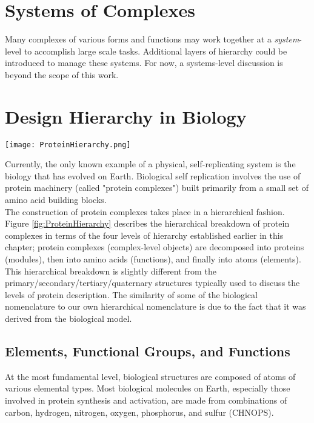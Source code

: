 {\section{Systems of Complexes}

Many complexes of various forms and functions may work together at a \textit{system}-level to accomplish large scale tasks.  Additional layers of hierarchy could be introduced to manage these systems.  For now, a systems-level discussion is beyond the scope of this work.

\section{Design Hierarchy in Biology}

\begin{sidewaysfigure}
  \texttt{[image: ProteinHierarchy.png]}
  \caption{Hierarchical breakdown of protein complexes (complexes) into proteins (modules), amino acids (functions), and atoms (elements).}
  \label{fig:ProteinHierarchy}
\end{sidewaysfigure}


Currently, the only known example of a physical, self-replicating system is the biology that has evolved on Earth.  Biological self replication involves the use of protein machinery (called "protein complexes") built primarily from a small set of amino acid building blocks.\\

The construction of protein complexes takes place in a hierarchical fashion.  Figure \ref{fig:ProteinHierarchy} describes the hierarchical breakdown of protein complexes in terms of the four levels of hierarchy established earlier in this chapter; protein complexes (complex-level objects) are decomposed into proteins (modules), then into amino acids (functions), and finally into atoms (elements).  This hierarchical breakdown is slightly different from the primary/secondary/tertiary/quaternary structures typically used to discuss the levels of protein description.  The similarity of some of the biological nomenclature to our own hierarchical nomenclature is due to the fact that it was derived from the biological model.

\subsection{Elements, Functional Groups, and Functions}

At the most fundamental level, biological structures are composed of atoms of various elemental types.  Most biological molecules on Earth, especially those involved in protein synthesis and activation, are made from combinations of carbon, hydrogen, nitrogen, oxygen, phosphorus, and sulfur (CHNOPS).\\

}
